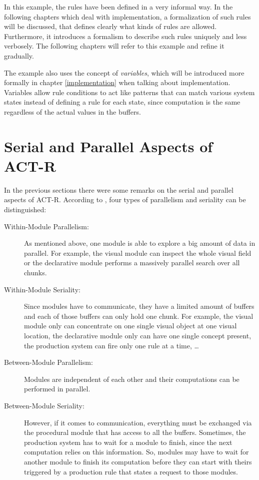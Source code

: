 In this example, the rules have been defined in a very informal way. In the following chapters which deal with implementation, a formalization of such rules will be discussed, that defines clearly what kinds of rules are allowed. Furthermore, it introduces a formalism to describe such rules uniquely and less verbosely. The following chapters will refer to this example and refine it gradually.

The example also uses the concept of \emph{variables}, which will be introduced more formally in chapter \ref{implementation} when talking about implementation. Variables allow rule conditions to act like patterns that can match various system states instead of defining a rule for each state, since computation is the same regardless of the actual values in the buffers.




\section{Serial and Parallel Aspects of ACT-R}
\label{serial_parallel_aspects}

In the previous sections there were some remarks on the serial and parallel aspects of ACT-R. According to \cite[p. 68]{anderson_how_2007}, four types of parallelism and seriality can be distinguished:

\begin{description}
 \item[Within-Module Parallelism:] As mentioned above, one module is able to explore a big amount of data in parallel. For example, the visual module can inspect the whole visual field or the declarative module performs a massively parallel search over all chunks.
 \item[Within-Module Seriality:] Since modules have to communicate, they have a limited amount of buffers and each of those buffers can only hold one chunk. For example, the visual module only can concentrate on one single visual object at one visual location, the declarative module only can have one single concept present, the production system can fire only one rule at a time, \dots 
 \item[Between-Module Parallelism:] Modules are independent of each other and their computations can be performed in parallel.
 \item[Between-Module Seriality:] However, if it comes to communication, everything must be exchanged via the procedural module that has access to all the buffers. Sometimes, the production system has to wait for a module to finish, since the next computation relies on this information. So, modules may have to wait for another module to finish its computation before they can start with theirs triggered by a production rule that states a request to those modules.
\end{description}

